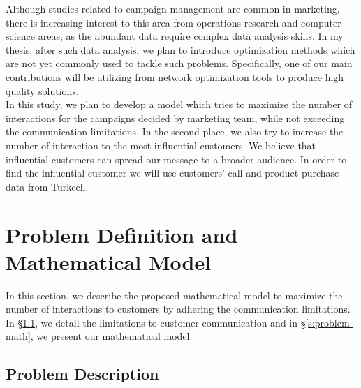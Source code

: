 \documentclass[11pt]{article}
\begin{document}
Although studies related to campaign management are common in marketing, there is increasing interest to this area from operations research and computer science areas, as the abundant data require complex data analysis skills. In my thesis, after such data analysis, we plan to introduce optimization methods which are not yet commonly used to tackle such problems. Specifically, one of our main contributions will be utilizing from network optimization tools to produce high quality solutions.\\

In this study, we plan to develop a model which tries to maximize the number of interactions for the campaigns decided by marketing team, while not exceeding the communication limitations. In the second place, we also try to increase the number of interaction to the most influential customers. We believe that influential customers can spread our message to a broader audience. In order to find the influential customer we will use customers' call and product purchase data from Turkcell.

\section{Problem Definition and Mathematical Model}  \label{s:problem-model}

In this section, we describe the proposed mathematical model to maximize the number of interactions to customers by adhering the communication limitations. In \S \ref{s:problem-desc}, we detail the limitations to customer communication and in \S \ref{s:problem-math}, we present our mathematical model.

\subsection{Problem Description} \label{s:problem-desc}
\end{document}
